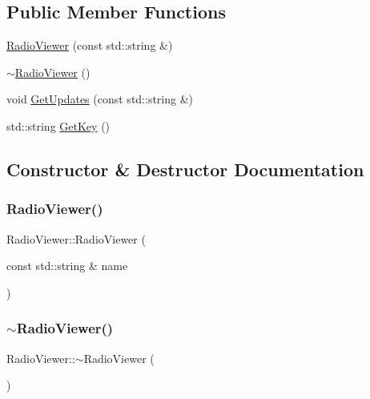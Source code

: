 \subsection*{Public Member Functions}
\begin{DoxyCompactItemize}
\item 
\mbox{\hyperlink{class_radio_viewer_a66b6bf44ba9e376fe6ed8a8d65d86f8f}{Radio\+Viewer}} (const std\+::string \&)
\item 
\mbox{\hyperlink{class_radio_viewer_ad960342dc830fe23e1bcca304cabb68c}{$\sim$\+Radio\+Viewer}} ()
\item 
void \mbox{\hyperlink{class_radio_viewer_a6600dc7ffbf75ad3ffebbe7b9e89f51e}{Get\+Updates}} (const std\+::string \&)
\item 
std\+::string \mbox{\hyperlink{class_radio_viewer_a24b69945b935d384749282fbad9ad606}{Get\+Key}} ()
\end{DoxyCompactItemize}


\subsection{Constructor \& Destructor Documentation}
\mbox{\label{class_radio_viewer_a66b6bf44ba9e376fe6ed8a8d65d86f8f}} 
\subsubsection{\texorpdfstring{RadioViewer()}{RadioViewer()}}
{\footnotesize\ttfamily Radio\+Viewer\+::\+Radio\+Viewer (\begin{DoxyParamCaption}\item[{const std\+::string \&}]{name }\end{DoxyParamCaption})}

\mbox{\label{class_radio_viewer_ad960342dc830fe23e1bcca304cabb68c}} 
\subsubsection{\texorpdfstring{$\sim$RadioViewer()}{~RadioViewer()}}
{\footnotesize\ttfamily Radio\+Viewer\+::$\sim$\+Radio\+Viewer (\begin{DoxyParamCaption}{ }\end{DoxyParamCaption})}



